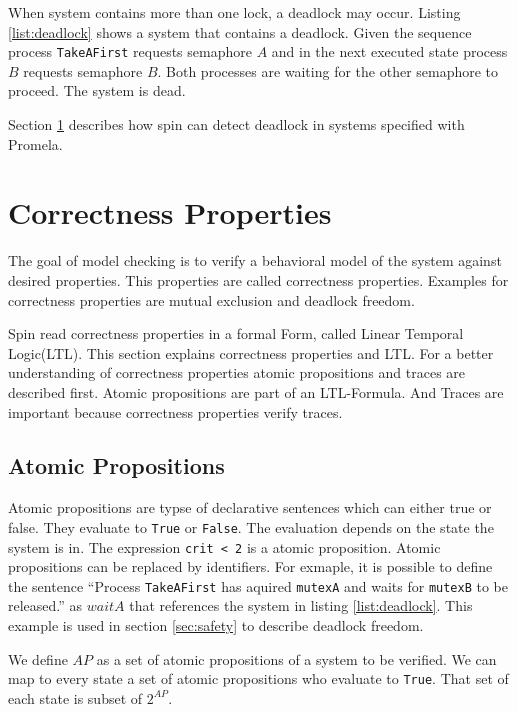 \documentclass[a4paper, twoside]{article}
\begin{document}
When system contains more than one lock, a deadlock may occur. Listing \ref{list:deadlock} shows a system that contains a deadlock. Given the sequence process \verb|TakeAFirst| requests semaphore $A$ and in the next executed state process $B$ requests semaphore $B$. Both processes are waiting for the other semaphore to proceed. The system is dead.

Section \ref{sec:ltl} describes how spin can detect deadlock in systems specified with Promela.



\section{Correctness Properties}
\label{sec:ltl}

The goal of model checking is to verify a behavioral model of the system against desired properties. This properties are called correctness properties. Examples for correctness properties are mutual exclusion and deadlock freedom. 

Spin read correctness properties in a formal Form, called Linear Temporal Logic(LTL). This section explains correctness properties and LTL. For a better understanding of correctness properties atomic propositions and traces are described first. Atomic propositions are part of an LTL-Formula. And Traces are important because correctness properties verify traces.

\subsection{Atomic Propositions}
\label{sec:atomicpropositions}

Atomic propositions are typse of declarative sentences which can either true or false. They evaluate to \verb|True| or \verb|False|. The evaluation depends on the state the system is in. The expression \verb|crit < 2| is a atomic proposition. Atomic propositions can be replaced by identifiers. For exmaple, it is possible to define the sentence ``Process \verb|TakeAFirst| has aquired \verb|mutexA| and waits for \verb|mutexB| to be released.'' as $waitA$  that references the system in listing \ref{list:deadlock}. This example is used in section \ref{sec:safety} to describe deadlock freedom.
 
We define $AP$ as a set of atomic propositions of a system to be verified. We can map to every state a set of atomic propositions who evaluate to \verb|True|. That set of each state is subset of $2^{AP}$.
\end{document}
